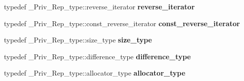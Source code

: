 \begin{DoxyCompactItemize}
typedef \+\_\+\+Priv\+\_\+\+Rep\+\_\+type\+::reverse\+\_\+iterator {\bfseries reverse\+\_\+iterator}
\item 
\mbox{\label{classmultiset_ae34b4440c24966f28f0b6928950785c9}} 
typedef \+\_\+\+Priv\+\_\+\+Rep\+\_\+type\+::const\+\_\+reverse\+\_\+iterator {\bfseries const\+\_\+reverse\+\_\+iterator}
\item 
\mbox{\label{classmultiset_ad84046a5c40d71049b4aaae0e22f35c6}} 
typedef \+\_\+\+Priv\+\_\+\+Rep\+\_\+type\+::size\+\_\+type {\bfseries size\+\_\+type}
\item 
\mbox{\label{classmultiset_af50537cba7ac3a5ac2e62cc870cfcec6}} 
typedef \+\_\+\+Priv\+\_\+\+Rep\+\_\+type\+::difference\+\_\+type {\bfseries difference\+\_\+type}
\item 
\mbox{\label{classmultiset_a3ad971916a02f9ccf0c92ffe1942cd9f}} 
typedef \+\_\+\+Priv\+\_\+\+Rep\+\_\+type\+::allocator\+\_\+type {\bfseries allocator\+\_\+type}
\end{DoxyCompactItemize}
